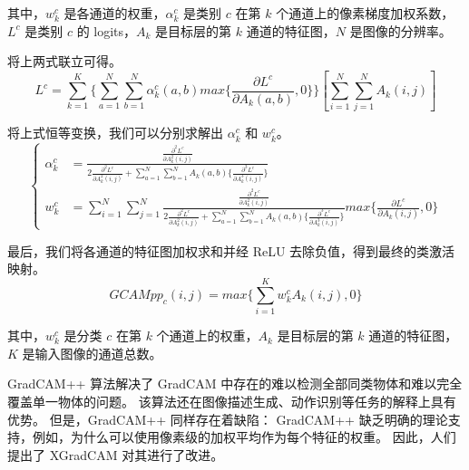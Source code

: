 \documentclass[supercite]{Experimental_Report}
\theoremstyle{definition}
\begin{document}
其中，$w_k^c$ 是各通道的权重，$\alpha_k^c$ 是类别 $c$ 在第 $k$ 个通道上的像素梯度加权系数，$L^c$ 是类别 $c$ 的 logits，$A_k$ 是目标层的第 $k$ 通道的特征图，$N$ 是图像的分辨率。

将上两式联立可得。
\begin{equation}
L^c=\sum_{k=1}^{K}\{\sum_{a=1}^{N}\sum_{b=1}^{N}\alpha_k^c(a,b)max\{\frac{\partial L^c}{\partial A_k(a,b)},0\}\}[\sum_{i=1}^{N}\sum_{j=1}^{N}A_k(i,j)]
\end{equation}

将上式恒等变换，我们可以分别求解出 $\alpha_k^c$ 和 $w_k^c$。
\begin{equation}
	\left\{
		\begin{aligned}
			\alpha_k^c&=\frac{\frac{\partial^2 L^c}{\partial A_k^2(i, j)}}{2\frac{\partial^2 L^c}{\partial A_k^2(i, j)}+\sum_{a=1}^{N}\sum_{b=1}^{N}A_k(a,b)\{\frac{\partial^3 L^c}{\partial A_k^3(i, j)}\}}\\
			w_k^c&=\sum_{i=1}^{N}\sum_{j=1}^{N}\frac{\frac{\partial^2 L^c}{\partial A_k^2(i, j)}}{2\frac{\partial^2 L^c}{\partial A_k^2(i, j)}+\sum_{a=1}^{N}\sum_{b=1}^{N}A_k(a,b)\{\frac{\partial^3 L^c}{\partial A_k^3(i, j)}\}}max\{\frac{\partial L^c}{\partial A_k(i, j)},0\}
		\end{aligned}
	\right.
\end{equation}

最后，我们将各通道的特征图加权求和并经 ReLU 去除负值，得到最终的类激活映射。
\begin{equation}
GCAMpp_c(i, j)=max\{\sum_{i=1}^{K}w_k^cA_k(i, j), 0\}
\end{equation}

其中，$w_k^c$ 是分类 $c$ 在第 $k$ 个通道上的权重，$A_k$ 是目标层的第 $k$ 通道的特征图，$K$ 是输入图像的通道总数。

GradCAM++ 算法解决了 GradCAM 中存在的难以检测全部同类物体和难以完全覆盖单一物体的问题。
该算法还在图像描述生成、动作识别等任务的解释上具有优势。
但是，GradCAM++ 同样存在着缺陷：
GradCAM++ 缺乏明确的理论支持，例如，为什么可以使用像素级的加权平均作为每个特征的权重。
因此，人们提出了 XGradCAM 对其进行了改进。
\end{document}
